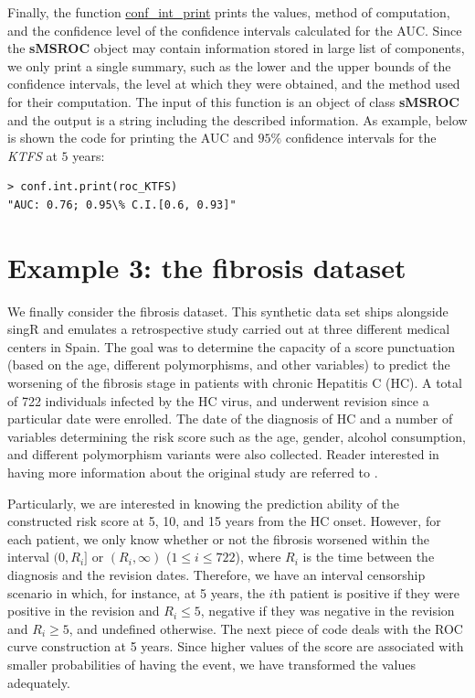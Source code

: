 Finally, the function {\url{conf\_int\_print}} prints the values, method of computation, and the confidence level of the confidence intervals calculated for the AUC. Since the {\textbf{sMSROC}} object may contain information stored in large list of components, we only print a single summary, such as the lower and the upper bounds of the confidence intervals, the level at which they were obtained, and the method used for their computation. The input of this function is an object of class {\textbf{sMSROC}} and the output is a string including the described information. As example, below is shown the code for printing the AUC and $95\%$ confidence intervals for the {\textit{KTFS}} at $5$ years:

\begin{verbatim}
> conf.int.print(roc_KTFS)
"AUC: 0.76; 0.95\% C.I.[0.6, 0.93]"
\end{verbatim}

\section{Example 3: the fibrosis dataset}
We finally consider the fibrosis dataset. This synthetic data set ships alongside singR and emulates a retrospective study carried out at three different medical centers in Spain. The goal was to determine the 
capacity of a score punctuation (based on the age, different polymorphisms, and other variables) to predict the worsening of the fibrosis stage in patients with chronic Hepatitis C (HC). A total of 
722 individuals infected by the HC virus, and underwent revision since a particular date were enrolled. The date of the diagnosis of HC and a number of variables determining the risk score such as the age, gender, alcohol consumption, and different polymorphism variants were also collected. Reader interested in having more information about the original study are referred to \citet{JoseRamon2020}.

Particularly, we are interested in knowing the prediction ability of the constructed risk score at 5, 10, and 15 years from the HC onset. However, for each patient, we only know whether or not  the fibrosis worsened within the interval $(0,R_i]$ or $(R_i, \infty)$ ($1\leq i\leq 722$), where $R_i$ is the time between the diagnosis and the revision dates. Therefore, we have an interval censorship scenario in which, for instance, at 5 years, the $i$th patient is positive if they were positive in the revision and $R_i\leq 5$, negative if they was negative in the revision and $R_i\geq 5$, and undefined otherwise. The next piece of code deals with the ROC curve construction at 5 years. Since higher values of the score are associated with smaller probabilities of having the event, we have transformed the values adequately.

